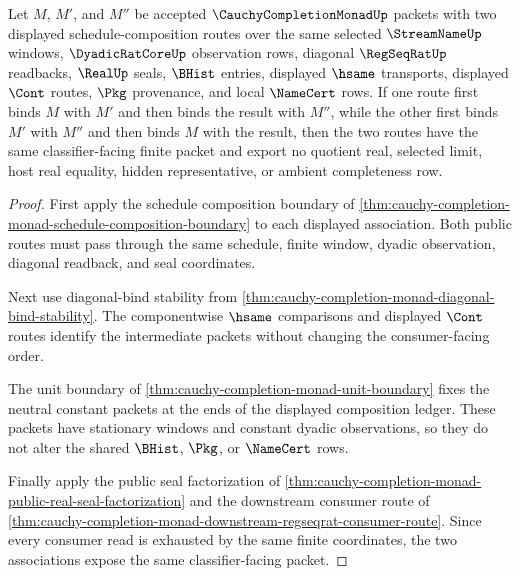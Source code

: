 \begin{theorem}
\label{thm:cauchy-completion-monad-associative-bind-law}
Let $M$, $M'$, and $M''$ be accepted $\CauchyCompletionMonadUp$ packets with two displayed schedule-composition routes over the same selected $\StreamNameUp$ windows, $\DyadicRatCoreUp$ observation rows, diagonal $\RegSeqRatUp$ readbacks, $\RealUp$ seals, $\BHist$ entries, displayed $\hsame$ transports, displayed $\Cont$ routes, $\Pkg$ provenance, and local $\NameCert$ rows. If one route first binds $M$ with $M'$ and then binds the result with $M''$, while the other first binds $M'$ with $M''$ and then binds $M$ with the result, then the two routes have the same classifier-facing finite packet and export no quotient real, selected limit, host real equality, hidden representative, or ambient completeness row.
\end{theorem}
\begin{proof}
First apply the schedule composition boundary of \autoref{thm:cauchy-completion-monad-schedule-composition-boundary} to each displayed association. Both public routes must pass through the same schedule, finite window, dyadic observation, diagonal readback, and seal coordinates.

Next use diagonal-bind stability from \autoref{thm:cauchy-completion-monad-diagonal-bind-stability}. The componentwise $\hsame$ comparisons and displayed $\Cont$ routes identify the intermediate packets without changing the consumer-facing order.

The unit boundary of \autoref{thm:cauchy-completion-monad-unit-boundary} fixes the neutral constant packets at the ends of the displayed composition ledger. These packets have stationary windows and constant dyadic observations, so they do not alter the shared $\BHist$, $\Pkg$, or $\NameCert$ rows.

Finally apply the public seal factorization of \autoref{thm:cauchy-completion-monad-public-real-seal-factorization} and the downstream consumer route of \autoref{thm:cauchy-completion-monad-downstream-regseqrat-consumer-route}. Since every consumer read is exhausted by the same finite coordinates, the two associations expose the same classifier-facing packet.
\end{proof}

